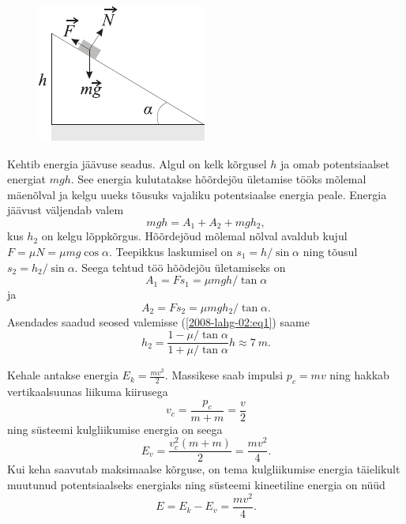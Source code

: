 \documentclass[10pt, twoside]{article}
\begin{document}
{
\solu
\begin{figure}
	\begin{center}
		\vspace{-25pt}
		\includegraphics[width=0.95\linewidth]{2008-lahg-02-lah}
	\end{center}
\end{figure}
Kehtib energia jäävuse seadus. Algul on kelk kõrgusel $h$ ja omab potentsiaalset energiat $mgh$. See energia kulutatakse hõõrdejõu ületamise tööks mõlemal mäenõlval ja kelgu uueks tõusuks vajaliku potentsiaalse energia peale. Energia jäävust väljendab valem 
\begin{equation} \label{2008-lahg-02:eq1}
mgh= A_1+ A_2+ mgh_2,
\end{equation}
kus $h_2$ on kelgu lõppkõrgus. Hõõrdejõud mõlemal nõlval avaldub kujul $F=\mu N=\mu mg \cos\alpha$. Teepikkus laskumisel on $s_1= h/ \sin\alpha$ ning tõusul $s_2= h_2/ \sin\alpha$. Seega tehtud töö hõõdejõu ületamiseks on
\[
A_1= F s_1=\mu mgh/\tan\alpha
\]
ja
\[
A_2= F s_2=\mu mgh_2/\tan\alpha.
\]
Asendades saadud seosed valemisse (\ref{2008-lahg-02:eq1}) saame
\[
h_2= \frac{1 - \mu/\tan\alpha}{1 + \mu/\tan\alpha}h \approx \SI{7}{m}.
\]
\probend
\bigskip


\solu
Kehale antakse energia $E_k = \frac{mv^2}{2}$. Massikese saab impulsi $p_c = mv$ ning hakkab vertikaalsuunas liikuma kiirusega
\[
v_{c}=\frac{p_{c}}{m+m}=\frac{v}{2}
\]
ning süsteemi kulgliikumise energia on seega
\[
E_{v}=\frac{v_{c}^{2}(m+m)}{2}=\frac{m v^{2}}{4}.
\]
Kui keha saavutab maksimaalse kõrguse, on tema kulgliikumise energia täielikult muutunud potentsiaalseks energiaks ning süsteemi kineetiline energia on nüüd
\[
E = E_k - E_v = \frac{mv^2}{4}.
\]
\probend
\bigskip

}
\end{document}
